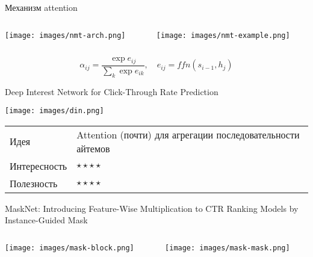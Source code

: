 \documentclass[11pt,aspectratio=169,handout]{beamer}
\begin{document}
\begin{frame}{Механизм attention \cite{NMT}}

\begin{columns}
\begin{column}{0.45\textwidth} 
\begin{center}
\texttt{[image: images/nmt-arch.png]}
\end{center}
\end{column}
\begin{column}{0.45\textwidth}
\begin{center}
\texttt{[image: images/nmt-example.png]}
\end{center}
\end{column}
\end{columns}

\vfill
\[
\alpha_{ij} = \frac{\exp e_{ij}}{\sum_k \exp e_{ik}}, \quad e_{ij} = ffn(s_{i-1}, h_j)
\]

\end{frame}

\begin{frame}{Deep Interest Network for Click-Through Rate Prediction \cite{DIN}}

\begin{center}
\texttt{[image: images/din.png]}
\end{center}

\vfill
\begin{small}
\begin{tabular}{l l}
Идея & Attention (почти) для агрегации последовательности айтемов \\
Интересность & $\star\star\star\star$ \\
Полезность & $\star\star\star\star$
\end{tabular}
\end{small}

\end{frame}

\begin{frame}{MaskNet: Introducing Feature-Wise Multiplication to CTR Ranking Models by Instance-Guided Mask \cite{MASKNET}}

\begin{columns}
\begin{column}{0.45\textwidth} 
\begin{center}
\texttt{[image: images/mask-block.png]}
\end{center}
\end{column}
\begin{column}{0.45\textwidth}
\begin{center}
\texttt{[image: images/mask-mask.png]}
\end{center}
\end{column}
\end{columns}

\end{frame}
\end{document}
